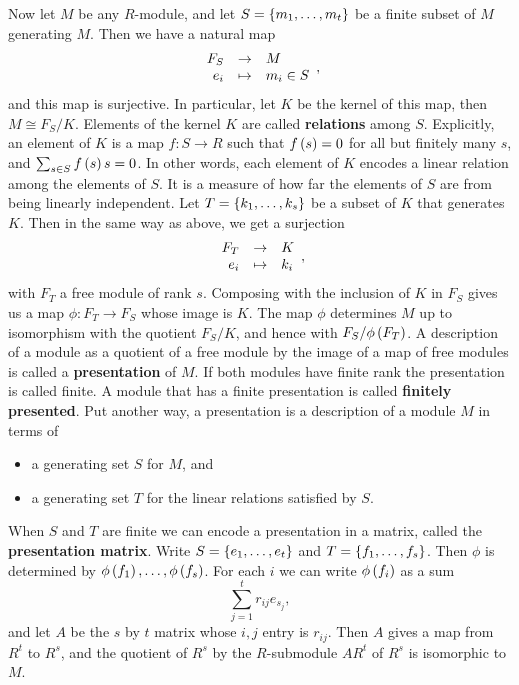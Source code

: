 Now let $ M $ be any $ R $-module, and let $ S = \left\{ m_1, \dots, m_t \right\} $ be a finite subset of $ M $ generating $ M $. Then we have a natural map
$$ \function{F_S}{M}{e_i}{m_i \in S}, $$
and this map is surjective. In particular, let $ K $ be the kernel of this map, then $ M \cong F_S / K $. Elements of the kernel $ K $ are called \textbf{relations} among $ S $. Explicitly, an element of $ K $ is a map $ f : S \to R $ such that $ f\left( s \right) = 0 $ for all but finitely many $ s $, and $ \sum_{s \in S} f\left( s \right)s = 0 $. In other words, each element of $ K $ encodes a linear relation among the elements of $ S $. It is a measure of how far the elements of $ S $ are from being linearly independent. Let $ T = \left\{ k_1, \dots, k_s \right\} $ be a subset of $ K $ that generates $ K $. Then in the same way as above, we get a surjection
$$ \function{F_T}{K}{e_i}{k_i}, $$
with $ F_T $ a free module of rank $ s $. Composing with the inclusion of $ K $ in $ F_S $ gives us a map $ \phi : F_T \to F_S $ whose image is $ K $. The map $ \phi $ determines $ M $ up to isomorphism with the quotient $ F_S / K $, and hence with $ F_S / \phi\left( F_T \right) $. A description of a module as a quotient of a free module by the image of a map of free modules is called a \textbf{presentation} of $ M $. If both modules have finite rank the presentation is called finite. A module that has a finite presentation is called \textbf{finitely presented}. Put another way, a presentation is a description of a module $ M $ in terms of
\begin{itemize}
\item a generating set $ S $ for $ M $, and
\item a generating set $ T $ for the linear relations satisfied by $ S $.
\end{itemize}
When $ S $ and $ T $ are finite we can encode a presentation in a matrix, called the \textbf{presentation matrix}. Write $ S = \left\{ e_1, \dots, e_t \right\} $ and $ T = \left\{ f_1, \dots, f_s \right\} $. Then $ \phi $ is determined by $ \phi\left( f_1 \right), \dots, \phi\left( f_s \right) $. For each $ i $ we can write $ \phi\left( f_i \right) $ as a sum
$$ \sum_{j = 1}^t r_{ij}e_{s_j}, $$
and let $ A $ be the $ s $ by $ t $ matrix whose $ i, j $ entry is $ r_{ij} $. Then $ A $ gives a map from $ R^t $ to $ R^s $, and the quotient of $ R^s $ by the $ R $-submodule $ AR^t $ of $ R^s $ is isomorphic to $ M $.

